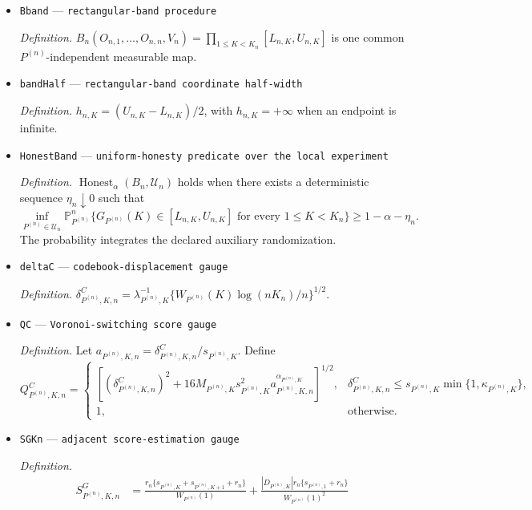 \documentclass{article}
\begin{document}
\begin{itemize}
  \item \texttt{Bband} --- \texttt{rectangular-\allowbreak{}band procedure}
  \par\smallskip\noindent\emph{Definition.} \(B_n(O_{n,1},\ldots,O_{n,n},V_n)=\prod_{1\le K<K_n}[L_{n,K},U_{n,K}]\) is one common \(P^{(n)}\)-independent measurable map.
  \item \texttt{bandHalf} --- \texttt{rectangular-\allowbreak{}band coordinate half-\allowbreak{}width}
  \par\smallskip\noindent\emph{Definition.} \(h_{n,K}=(U_{n,K}-L_{n,K})/2\), with \(h_{n,K}=+\infty\) when an endpoint is infinite.
  \item \texttt{HonestBand} --- \texttt{uniform-\allowbreak{}honesty predicate over the local experiment}
  \par\smallskip\noindent\emph{Definition.} \(\operatorname{Honest}_{\alpha}(B_n,\mathcal U_n)\) holds when there exists a deterministic sequence \(\eta_n\downarrow0\) such that \[\inf_{P^{(n)}\in\mathcal U_n}\mathbb P_{P^{(n)}}^n\{G_{P^{(n)}}(K)\in[L_{n,K},U_{n,K}]\text{ for every }1\le K<K_n\}\ge1-\alpha-\eta_n.\] The probability integrates the declared auxiliary randomization.
  \item \texttt{deltaC} --- \texttt{codebook-\allowbreak{}displacement gauge}
  \par\smallskip\noindent\emph{Definition.} \(\delta^C_{P^{(n)},K,n}=\lambda_{P^{(n)},K}^{-1}\{W_{P^{(n)}}(K)\log(nK_n)/n\}^{1/2}\).
  \item \texttt{QC} --- \texttt{Voronoi-\allowbreak{}switching score gauge}
  \par\smallskip\noindent\emph{Definition.} Let \(a_{P^{(n)},K,n}=\delta^C_{P^{(n)},K,n}/s_{P^{(n)},K}\).  Define
\[
 Q^C_{P^{(n)},K,n}=
 \begin{cases}
 [(\delta^C_{P^{(n)},K,n})^2+16M_{P^{(n)},K}s_{P^{(n)},K}^2
 a_{P^{(n)},K,n}^{\alpha_{P^{(n)},K}}]^{1/2},
 &\delta^C_{P^{(n)},K,n}\leq s_{P^{(n)},K}\min\{1,\kappa_{P^{(n)},K}\},\\
 1,&\text{otherwise}.
 \end{cases}
\]
  \item \texttt{SGKn} --- \texttt{adjacent score-\allowbreak{}estimation gauge}
  \par\smallskip\noindent\emph{Definition.} \[
 \begin{aligned}
 S^G_{P^{(n)},K,n}
 &=\frac{r_n\{s_{P^{(n)},K}+s_{P^{(n)},K+1}+r_n\}}{W_{P^{(n)}}(1)}
 +\frac{|D_{P^{(n)},K}|r_n\{s_{P^{(n)},1}+r_n\}}{W_{P^{(n)}}(1)^2}\\

\end{aligned}\]
\end{itemize}
\end{document}
